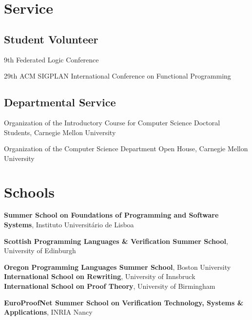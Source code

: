 \documentclass[12pt,a4paper]{moderncv}
\newenvironment{datedescription}{%
    \begin{description}[
        style=multiline,
        labelwidth=66pt,
        labelsep=6pt,
        leftmargin=72pt,
        align=right,
        itemsep=0.25em,
        parsep=0pt,
        topsep=0.25em
    ]
}{\end{description}}
\begin{document}

\section{Service}

\subsection{Student Volunteer}

\begin{datedescription}
    \item[\normalfont{\emph{2026}}] 9th Federated Logic Conference
    \item[\normalfont{\emph{2024}}] 29th ACM SIGPLAN International Conference on Functional Programming
\end{datedescription}

\subsection{Departmental Service}

\begin{datedescription}
    \item[\normalfont{\emph{2026}}] Organization of the Introductory Course for Computer Science Doctoral Students, Carnegie Mellon University
    \item[\normalfont{\emph{2026}}] Organization of the Computer Science Department Open House, Carnegie Mellon University
\end{datedescription}


\section{Schools}

\begin{datedescription}
    \item[\normalfont{\emph{2026}}] \textbf{Summer School on Foundations of Programming and Software Systems}, Instituto Universitário de Lisboa
    \item[\normalfont{\emph{2025}}] \textbf{Scottish Programming Languages \& Verification Summer School}, University of Edinburgh
    \item[\normalfont{\emph{2024}}] \textbf{Oregon Programming Languages Summer School}, Boston University
    \\ \textbf{International School on Rewriting}, University of Innsbruck
    \\ \textbf{International School on Proof Theory}, University of Birmingham
    \item[\normalfont{\emph{2023}}] \textbf{EuroProofNet Summer School on Verification Technology, Systems \& Applications}, INRIA Nancy
\end{datedescription}
\end{document}
